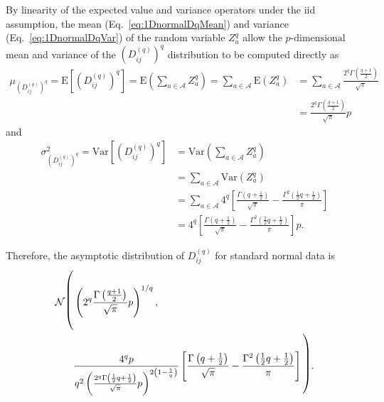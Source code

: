 \documentclass[aoas]{imsart}
\begin{document}
By linearity of the expected value and variance operators under the iid assumption, the mean (Eq.~\ref{eq:1DnormalDqMean}) and variance (Eq.~\ref{eq:1DnormalDqVar}) of the random variable $Z^q_a$ allow the $p\text{-dimensional}$ mean and variance of the $\left(D^{(q)}_{ij}\right)^q$ distribution to be computed directly as
%
\begin{equation}\label{eq:normalDqMean}
\begin{aligned}
\mu_{\left(D^{(q)}_{ij}\right)^q} = \text{E}\left[\left(D^{(q)}_{ij}\right)^q\right] = \text{E}\left(\sum_{a \in \mathcal{A}} Z^q_a\right) = \sum_{a \in \mathcal{A}} \text{E}\left(Z^q_a\right) &= \sum_{a \in \mathcal{A}} \frac{2^q \Gamma\left(\frac{q + 1}{2}\right)}{\sqrt{\pi}} \\
&=  \frac{2^q\Gamma\left(\frac{q + 1}{2}\right)}{\sqrt{\pi}}p
\end{aligned}
\end{equation}
%
and
%
\begin{equation}\label{eq:normalVar}
\begin{split}
\sigma^2_{\left(D^{(q)}_{ij}\right)^q} = \text{Var}\left[\left(D^{(q)}_{ij}\right)^q\right] &= \text{Var}\left(\sum_{a \in \mathcal{A}} Z^q_a\right) \\
&= \sum_{a \in \mathcal{A}} \text{Var}\left(Z^q_a\right) \\
&= \sum_{a \in \mathcal{A}} 4^{q}\left[\frac{\Gamma\left(q + \frac{1}{2}\right)}{\sqrt{\pi}} - \frac{\Gamma^2\left(\frac{1}{2}q + \frac{1}{2}\right)}{\pi}\right] \\
&= 4^{q}\left[\frac{\Gamma\left(q + \frac{1}{2}\right)}{\sqrt{\pi}} - \frac{\Gamma^2\left(\frac{1}{2}q + \frac{1}{2}\right)}{\pi}\right]p.
\end{split}
\end{equation}

Therefore, the asymptotic distribution of $D^{(q)}_{ij}$ for standard normal data is
%
\begin{equation}\label{eq:normalDistr}
\begin{aligned}
\mathcal{N}{\fontsize{0.7cm}{1pt}\selectfont \Biggl(}&\left(2^q\frac{\Gamma\left(\frac{q + 1}{2}\right)}{\sqrt{\pi}}p\right)^{1/q}, \\
&\frac{4^q p}{q^2 \left(\frac{2^q \Gamma\left(\frac{1}{2}q + \frac{1}{2}\right)}{\sqrt{\pi}}p\right)^{2\left(1 - \frac{1}{q}\right)}}\left[\frac{\Gamma\left(q + \frac{1}{2}\right)}{\sqrt{\pi}} - \frac{\Gamma^2\left(\frac{1}{2}q + \frac{1}{2}\right)}{\pi}\right]{\fontsize{0.7cm}{1pt}\selectfont \Biggr)}.
\end{aligned}
\end{equation}
\end{document}
